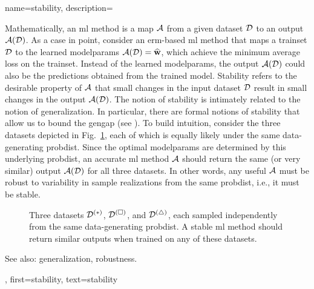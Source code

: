 {name={stability},
	description={Mathematically, an \gls{ml} method is a \gls{map} $\mathcal{A}$ from a given \gls{dataset} $\mathcal{D}$ 
		to an \gls{output} $\mathcal{A}(\mathcal{D})$. As a case in point, consider an \gls{erm}-based 
		\gls{ml} method that maps a \gls{trainset} $\mathcal{D}$ to the learned \glspl{modelparam} 
		$\mathcal{A}(\mathcal{D}) = \widehat{{\bf w}}$, which achieve the \gls{minimum} average \gls{loss} 
		on the \gls{trainset}. Instead of the learned \glspl{modelparam}, the 
		\gls{output} $\mathcal{A}(\mathcal{D})$ could also be the \glspl{prediction} obtained from 
		the trained \gls{model}. Stability refers to the desirable property 
		of $\mathcal{A}$ that small changes in the input \gls{dataset} $\mathcal{D}$ result in small 
		changes in the \gls{output} $\mathcal{A}(\mathcal{D})$. The notion of stability is intimately related 
		to the notion of \gls{generalization}. In particular, there are formal notions of stability  
		that allow us to bound the \gls{gengap} (see \cite[Ch.~13]{ShalevMLBook}).
		To build intuition, consider the three \glspl{dataset} depicted in Fig.\ \ref{fig_three_data_stability_dict}, each 
		of which is equally likely under the same \gls{data}-generating \gls{probdist}. Since the 
		optimal \glspl{modelparam} are determined by this underlying \gls{probdist}, an accurate 
		\gls{ml} method $\mathcal{A}$ should return the same (or very similar) \gls{output} $\mathcal{A}(\mathcal{D})$ 
		for all three \glspl{dataset}. In other words, any useful $\mathcal{A}$ must be robust to 
		variability in \gls{sample} \glspl{realization} from the same \gls{probdist}, i.e., it must be stable. 
		\begin{figure}[H]
			\centering
		\caption{Three \glspl{dataset} $\mathcal{D}^{(*)}$, $\mathcal{D}^{(\square)}$, 
			and $\mathcal{D}^{(\triangle)}$, each sampled independently from the same 
			\gls{data}-generating \gls{probdist}. A stable \gls{ml} method should return 
			similar \glspl{output} when trained on any of these \glspl{dataset}. \label{fig_three_data_stability_dict}}
		\end{figure}
		See also: \gls{generalization}, \gls{robustness}.}, 
	first={stability}, 
	text={stability} 
}

